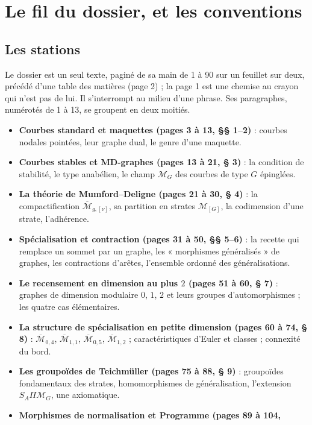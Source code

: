 \documentclass[11pt,a4paper]{article}
\begin{document}
\section*{Le fil du dossier, et les conventions}

\subsection*{Les stations}

Le dossier est un seul texte, paginé de sa main de 1 à 90 sur un feuillet sur
deux, précédé d'une table des matières (page 2) ; la page 1 est une chemise au
crayon qui n'est pas de lui. Il s'interrompt au milieu d'une phrase. Ses
paragraphes, numérotés de 1 à 13, se groupent en deux moitiés.

\begin{itemize}
\item \textbf{Courbes standard et maquettes (pages 3 à 13, §§ 1--2)} : courbes
nodales pointées, leur graphe dual, le genre d'une maquette.
\item \textbf{Courbes stables et MD-graphes (pages 13 à 21, § 3)} : la condition
de stabilité, le type anabélien, le champ $\mathcal{M}_G$ des courbes de type
$G$ épinglées.
\item \textbf{La théorie de Mumford--Deligne (pages 21 à 30, § 4)} : la
compactification $\overline{\mathcal{M}}_{g,[\nu]}$, sa partition en strates
$\mathcal{M}_{[G]}$, la codimension d'une strate, l'adhérence.
\item \textbf{Spécialisation et contraction (pages 31 à 50, §§ 5--6)} : la recette
qui remplace un sommet par un graphe, les « morphismes généralisés » de graphes,
les contractions d'arêtes, l'ensemble ordonné des généralisations.
\item \textbf{Le recensement en dimension au plus $2$ (pages 51 à 60, § 7)} :
graphes de dimension modulaire $0$, $1$, $2$ et leurs groupes d'automorphismes ;
les quatre cas élémentaires.
\item \textbf{La structure de spécialisation en petite dimension (pages 60 à 74,
§ 8)} : $\overline{\mathcal{M}}_{0,4}$, $\overline{\mathcal{M}}_{1,1}$,
$\overline{\mathcal{M}}_{0,5}$, $\overline{\mathcal{M}}_{1,2}$ ;
caractéristiques d'Euler et classes ; connexité du bord.
\item \textbf{Les groupoïdes de Teichmüller (pages 75 à 88, § 9)} : groupoïdes
fondamentaux des strates, homomorphismes de généralisation, l'extension
$S_A\Pi\mathcal{M}_G$, une axiomatique.
\item \textbf{Morphismes de normalisation et Programme (pages 89 à 104,
}
\end{itemize}
\end{document}
